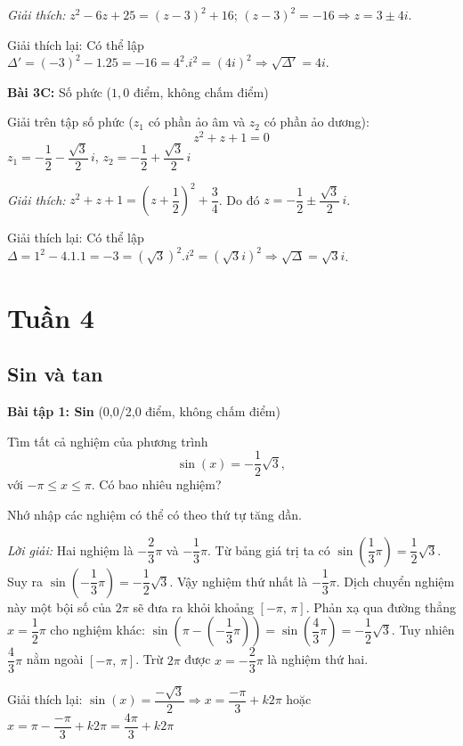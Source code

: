 \documentclass[12pt,a4paper]{article}
\begin{document}
\textit{Giải thích:}
$z^2 - 6z + 25 = (z-3)^2 + 16$; \quad $(z-3)^2 = -16 \Rightarrow z = 3 \pm 4i$.

Giải thích lại: Có thể lập $\Delta' = (-3)^2 - 1.25 = -16 = 4^2.i^2 = (4i)^2 \Rightarrow \sqrt{\Delta'} = 4i$.

\textbf{Bài 3C:} Số phức ($1{,}0$ điểm, không chấm điểm)

Giải trên tập số phức ($z_1$ có phần ảo âm và $z_2$ có phần ảo dương):
\[
z^2 + z + 1 = 0
\]
$z_1 = -\dfrac{1}{2}-\dfrac{\sqrt{3}}{2}\,i$, \quad $z_2 = -\dfrac{1}{2}+\dfrac{\sqrt{3}}{2}\,i$

\textit{Giải thích:}
$z^2 + z + 1 = \left(z + \dfrac{1}{2}\right)^2 + \dfrac{3}{4}$. Do đó $z = -\dfrac{1}{2} \pm \dfrac{\sqrt{3}}{2}\,i$.

Giải thích lại: Có thể lập $\Delta = 1^2 - 4.1.1 = -3 = (\sqrt{3})^2.i^2 = (\sqrt{3}i)^2 \Rightarrow \sqrt{\Delta} = \sqrt{3}i$.

\newpage
\section{Tuần 4}

\subsection{Sin và tan}

\textbf{Bài tập 1: Sin} (0{,}0/2{,}0 điểm, không chấm điểm)

Tìm tất cả nghiệm của phương trình
\[
\sin(x) = -\dfrac{1}{2}\sqrt{3},
\]
với $-\pi \le x \le \pi$. Có bao nhiêu nghiệm?

Nhớ nhập các nghiệm có thể có theo thứ tự tăng dần.

\textit{Lời giải:} Hai nghiệm là $-\dfrac{2}{3}\pi$ và $-\dfrac{1}{3}\pi$. Từ bảng giá trị ta có $\sin(\dfrac{1}{3}\pi) = \dfrac{1}{2}\sqrt{3}$. Suy ra $\sin(-\dfrac{1}{3}\pi) = -\dfrac{1}{2}\sqrt{3}$. Vậy nghiệm thứ nhất là $-\dfrac{1}{3}\pi$. Dịch chuyển nghiệm này một bội số của $2\pi$ sẽ đưa ra khỏi khoảng $[-\pi,\,\pi]$. Phản xạ qua đường thẳng $x = \dfrac{1}{2}\pi$ cho nghiệm khác: $\sin(\pi - (-\dfrac{1}{3}\pi)) = \sin(\dfrac{4}{3}\pi) = -\dfrac{1}{2}\sqrt{3}$. Tuy nhiên $\dfrac{4}{3}\pi$ nằm ngoài $[-\pi,\,\pi]$. Trừ $2\pi$ được $x = -\dfrac{2}{3}\pi$ là nghiệm thứ hai.

Giải thích lại: $\sin(x) = \dfrac{-\sqrt{3}}{2} \Rightarrow x = \dfrac{-\pi}{3} + k2\pi$ hoặc $x = \pi - \dfrac{-\pi}{3} + k2\pi = \dfrac{4\pi}{3} + k2\pi$
\end{document}
